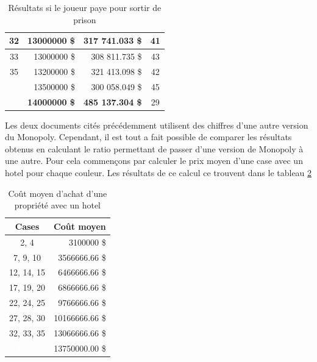 \documentclass[letterpaper]{article}
\begin{document}
\begin{table}
\begin{tabular}{|c|r|r|c|}
	\cellcolor[HTML]{2E8B57} 32 & 13000000 \$ & 317 741.033 \$ & 41 \\ \hline
	\cellcolor[HTML]{2E8B57} 33 & 13000000 \$ & 308 811.735 \$ & 43 \\ \hline
	\cellcolor[HTML]{2E8B57} 35 & 13200000 \$ & 321 413.098 \$ & 42 \\ \hline
	\cellcolor[HTML]{483D8B} \textcolor{white}{38} & 13500000 \$ & 300 058.049 \$ & 45 \\ \hline
	\cellcolor[HTML]{483D8B} \textcolor{white}{40} & \textbf{14000000 \$} & \textbf{485 137.304 \$} & 29 \\ \hline
      \end{tabular}
      \caption{Résultats si le joueur paye pour sortir de prison}
      \label{table:result_tour_paye}
    \end{table}

    Les deux documents cités précédemment utilisent
    des chiffres d'une autre version du Monopoly.  Cependant, il est
    tout a fait possible de comparer les résultats obtenus en calculant
    le ratio permettant de passer d'une version de Monopoly à une autre.
    Pour cela commençons par calculer le prix moyen d'une case avec un
    hotel pour chaque couleur.  Les résultats de ce calcul ce trouvent
    dans le tableau \ref{table:result_cout_couleur}

    \begin{table}
      \centering
      \begin{tabular}{|c|r|}
      \hline
      \multicolumn{1}{|c|}{\textbf{Cases}} &
      \multicolumn{1}{c|}{\textbf{Coût moyen}} \\ \hline
      \cellcolor[HTML]{A0522D} 2, 4 & 3100000 \$ \\ \hline
      \cellcolor[HTML]{1E90FF} 7, 9, 10 & 3566666.66 \$ \\ \hline
      \cellcolor[HTML]{FF69B4} 12, 14, 15 & 6466666.66 \$ \\ \hline
      \cellcolor[HTML]{FF8C00} 17, 19, 20 & 6866666.66 \$ \\ \hline
      \cellcolor[HTML]{FF4500} 22, 24, 25 & 9766666.66 \$ \\ \hline
      \cellcolor[HTML]{FFD700} 27, 28, 30 & 10166666.66 \$ \\ \hline
      \cellcolor[HTML]{2E8B57} 32, 33, 35 & 13066666.66 \$ \\ \hline
      \cellcolor[HTML]{483D8B} \textcolor{white}{38, 40} & 13750000.00 \$ \\ \hline
      \end{tabular}
      \caption{Coût moyen d'achat d'une propriété avec un hotel}
      \label{table:result_cout_couleur}
    \end{table}
\end{document}
